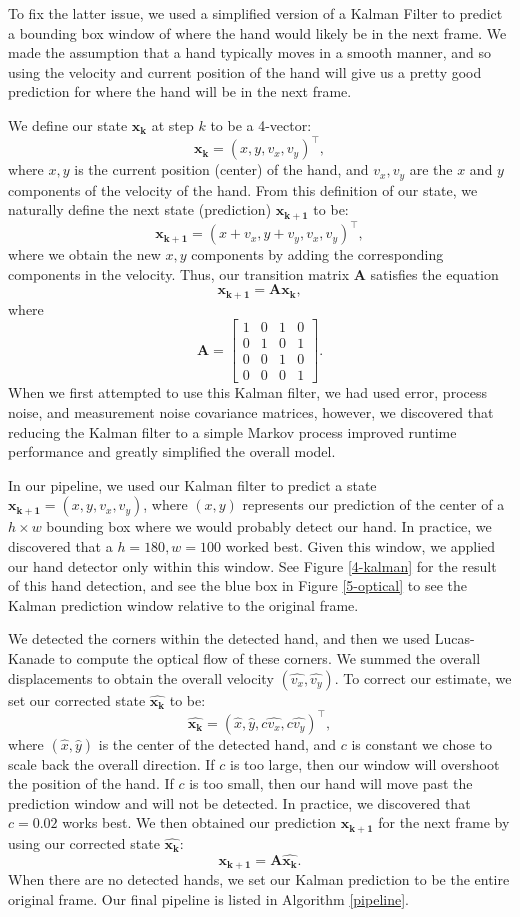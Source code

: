\documentclass[12pt]{article}
\newcommand{\m}[1]{\mathbf{#1}}
\newcommand{\transpose}[1]{{#1}^\top}
\begin{document}
To fix the latter issue, we used a simplified version of a Kalman Filter \cite{kalmanfilter} to predict a bounding box window of where the hand would likely be in the next frame. We made the assumption that a hand typically moves in a smooth manner, and so using the velocity and current position of the hand will give us a pretty good prediction for where the hand will be in the next frame. 

We define our state $\m{x_k}$ at step $k$ to be a 4-vector:
$$\m{x_k} = \transpose{(x, y, v_x, v_y)},$$
where $x,y$ is the current position (center) of the hand, and $v_x, v_y$ are the $x$ and $y$ components of the velocity of the hand. From this definition of our state, we naturally define the next state (prediction) $\m{x_{k+1}}$ to be:
$$\m{x_{k+1}} = \transpose{(x + v_x, y + v_y, v_x, v_y)},$$
where we obtain the new $x,y$ components by adding the corresponding components in the velocity. Thus, our transition matrix $\m{A}$ satisfies the equation
$$\m{x_{k+1}} = \m{A} \m{x_k},$$
where
$$\m{A} = 
\begin{bmatrix}
1 & 0 & 1 & 0 \\
0 & 1 & 0 & 1 \\
0 & 0 & 1 & 0 \\
0 & 0 & 0 & 1
\end{bmatrix}.
$$
When we first attempted to use this Kalman filter, we had used error, process noise, and measurement noise covariance matrices, however, we discovered that reducing the Kalman filter to a simple Markov process improved runtime performance and greatly simplified the overall model. 

In our pipeline, we used our Kalman filter to predict a state $\m{x_{k+1}} = (x,y,v_x,v_y)$, where $(x,y)$ represents our prediction of the center of a $h \times w$ bounding box where we would probably detect our hand. In practice, we discovered that a $h = 180, w = 100$ worked best. Given this window, we applied our hand detector only within this window. See Figure \ref{4-kalman} for the result of this hand detection, and see the blue box in Figure \ref{5-optical} to see the Kalman prediction window relative to the original frame. 

We detected the corners within the detected hand, and then we used Lucas-Kanade \cite{lucaskanade} to compute the optical flow of these corners. We summed the overall displacements to obtain the overall velocity $(\hat{v_x}, \hat{{v_y}})$. To correct our estimate, we set our corrected state $\m{\hat{x_k}}$ to be:
$$\m{\hat{x_k}} = \transpose{(\hat{x}, \hat{y}, c\hat{v_x}, c\hat{v_y})},$$
where $(\hat{x},\hat{y})$ is the center of the detected hand, and $c$ is constant we chose to scale back the overall direction. If $c$ is too large, then our window will overshoot the position of the hand. If $c$ is too small, then our hand will move past the prediction window and will not be detected. In practice, we discovered that $c = 0.02$ works best. We then obtained our prediction $\m{x_{k+1}}$ for the next frame by using our corrected state $\m{\hat{x_k}}$:
$$\m{x_{k+1}} = \m{A} \m{\hat{x_k}}.$$
When there are no detected hands, we set our Kalman prediction to be the entire original frame. Our final pipeline is listed in Algorithm \ref{pipeline}.
\end{document}
